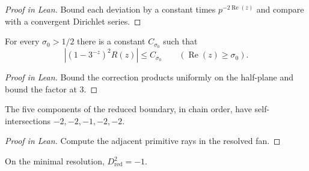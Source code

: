 \begin{proof}[Proof in Lean]

\leanok

Bound each deviation by a constant times $p^{-2\operatorname{Re}(z)}$ and compare with a convergent Dirichlet series.

\end{proof}

\begin{supportinglemma}

\label{helper:correctionBound}


\leanok

For every $\sigma_0>1/2$ there is a constant $C_{\sigma_0}$ such that \[|(1-3^{-z})^2R(z)|\leq C_{\sigma_0}\qquad(\operatorname{Re}(z)\geq\sigma_0).\]

\end{supportinglemma}

\begin{proof}[Proof in Lean]

\leanok


Bound the correction products uniformly on the half-plane and bound the factor at $3$.

\end{proof}

\begin{supportinglemma}

\label{helper:boundaryChain}


\leanok

The five components of the reduced boundary, in chain order, have self-intersections $-2,-2,-1,-2,-2$.

\end{supportinglemma}

\begin{proof}[Proof in Lean]

\leanok

Compute the adjacent primitive rays in the resolved fan.

\end{proof}

\begin{supportinglemma}

\label{helper:boundaryIntersection}


\leanok

On the minimal resolution, $D_{\mathrm{red}}^2=-1$.

\end{supportinglemma}


